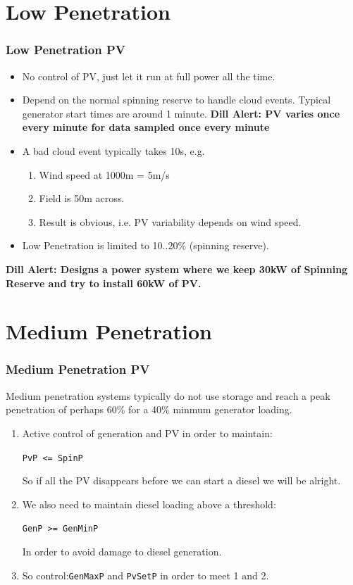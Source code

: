 \documentclass{beamer}
\def\dill#1{\textcolor{RawSienna}{\textbf{Dill Alert: #1}}}
\begin{document}
\section{Low Penetration}
\begin{frame}\frametitle{Low Penetration PV}
  \begin{itemize}
  \item No control of PV, just let it run at full power all the time.
    \pause
  \item Depend on the normal spinning reserve to handle
    cloud events. Typical generator start times are around 1 minute.
    \pause
    \dill{PV varies once every minute for data sampled once 
      every minute}
    \pause
  \item A bad cloud event typically takes 10s, e.g.
    \begin{enumerate}
    \item Wind speed at 1000m = 5m/s
    \item Field is 50m across.
    \item Result is obvious, i.e. PV variability depends on wind speed.
    \end{enumerate}
  \item Low Penetration is limited to 10..20\% (spinning reserve).
  \end{itemize}
  \dill{Designs a power system where we keep 30kW of
    Spinning Reserve and try to install 60kW of PV.}
\end{frame}

\section{Medium Penetration}
\begin{frame}\frametitle{Medium Penetration PV}
Medium penetration systems typically do not use storage and
reach a peak penetration of perhaps 60\% for a 40\% minmum generator
loading.
\pause
  \begin{enumerate}
  \item Active control of generation and PV in order to maintain:
    
    \texttt{PvP <= SpinP}

    So if all the PV disappears before we can start a diesel we will
    be alright.
    \pause
  \item We also need to maintain diesel loading above a threshold:
    
    \texttt{GenP >= GenMinP}

    In order to avoid damage to diesel generation.
    \pause
  \item So control:\texttt{GenMaxP} and \texttt{PvSetP} in order to
    meet 1 and 2.
  \end{enumerate}
\end{frame}
\end{document}
